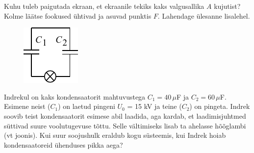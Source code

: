 \documentclass[10pt]{article}
\begin{document}

Kuhu tuleb paigutada ekraan, et ekraanile tekiks kaks valgusallika $A$ kujutist? Kolme läätse fookused ühtivad ja asuvad punktis $F$. Lahendage ülesanne lisalehel.
\probend
\bigskip


\begin{figure}
\vspace{-0.8cm}
  \begin{center}
    \includegraphics[width=1\linewidth]{2023-lahg-04-yl.pdf}
  \end{center}
  \vspace{-0.9cm}
\end{figure}

Indrekul on kaks kondensaatorit mahtuvustega $C_1=40\,\mu$F ja $C_2=60\,\mu$F. Esimene neist ($C_1$) on laetud pingeni $U_0$ = 15 kV ja teine ($C_2$) on pingeta. Indrek soovib teist kondensaatorit esimese abil laadida, aga kardab, et laadimisjuhtmed süttivad suure voolutugevuse tõttu. Selle vältimiseks lisab ta ahelasse hõõglambi (vt joonis). Kui suur soojushulk eraldub  kogu süsteemis, kui Indrek hoiab kondensaatoreid ühenduses pikka aega?
\probend
\bigskip
\end{document}
